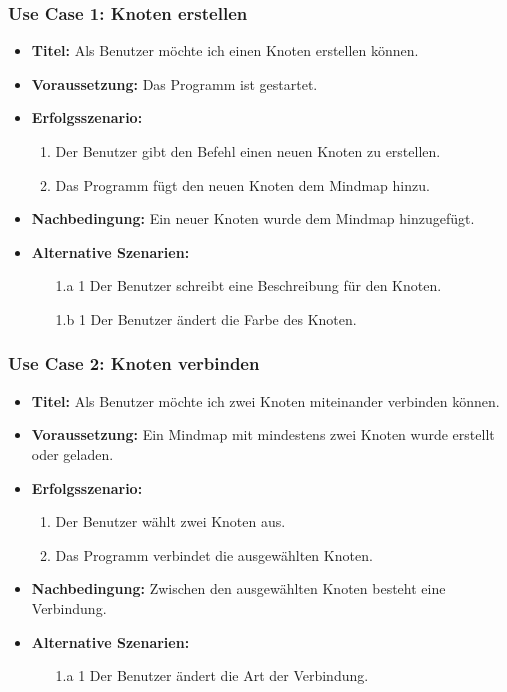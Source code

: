 \subsubsection{Use Case 1: Knoten erstellen}
\begin{itemize}
\item \textbf{Titel:} Als Benutzer möchte ich einen Knoten erstellen können.
\item \textbf{Voraussetzung:} Das Programm ist gestartet.
\item \textbf{Erfolgsszenario:}
	\begin{enumerate}
	\item Der Benutzer gibt den Befehl einen neuen Knoten zu erstellen.
	\item Das Programm fügt den neuen Knoten dem Mindmap hinzu.
	\end{enumerate}
\item \textbf{Nachbedingung:} Ein neuer Knoten wurde dem Mindmap hinzugefügt.
\item \textbf{Alternative Szenarien:}
	\begin{enumerate}
	\item [1.a 1] Der Benutzer schreibt eine Beschreibung für den Knoten.
	\item []
	\item [1.b 1] Der Benutzer ändert die Farbe des Knoten.
	\end{enumerate}
\end{itemize}

\subsubsection{Use Case 2: Knoten verbinden}
\begin{itemize}
\item \textbf{Titel:} Als Benutzer möchte ich zwei Knoten miteinander verbinden können.
\item \textbf{Voraussetzung:} Ein Mindmap mit mindestens zwei Knoten wurde erstellt oder geladen.
\item \textbf{Erfolgsszenario:}
	\begin{enumerate}
	\item Der Benutzer wählt zwei Knoten aus.
	\item Das Programm verbindet die ausgewählten Knoten.
	\end{enumerate}
\item \textbf{Nachbedingung:} Zwischen den ausgewählten Knoten besteht eine Verbindung.
\item \textbf{Alternative Szenarien:}
	\begin{enumerate}
	\item [1.a 1] Der Benutzer ändert die Art der Verbindung.
	\end{enumerate}
\end{itemize}

